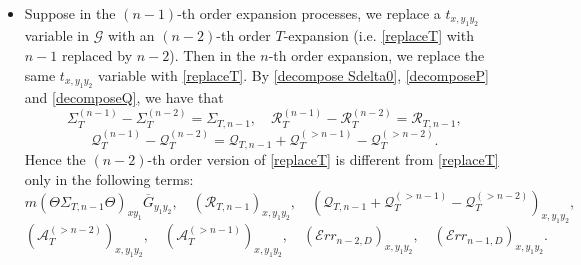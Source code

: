 \documentclass{article}
\newcommand{\1}{\mathds{1}}
\numberwithin{equation}{section}
\renewcommand{\cal}{\mathcal}
\theoremstyle{plain} %
\theoremstyle{remark}
\newcommand{\Sdelta}{{\Sigma}_T}
\newcommand{\PT}{\mathcal R_T}
\newcommand{\QT}{\mathcal Q_T}
\newcommand{\AT}{\mathcal A_T}
\newcommand{\Err}{{\mathcal Err}}
\begin{document}
\begin{itemize}
\item Suppose in the $(n-1)$-th order expansion processes, we replace a $t_{x,y_1y_2}$ variable in $\cal G$ with an $(n-2)$-th order $T$-expansion (i.e. \eqref{replaceT} with $n-1$ replaced by $n-2$). Then in the $n$-th order expansion, we replace the {same $t_{x,y_1y_2}$ variable} with \eqref{replaceT}. By \eqref{decompose Sdelta0}, \eqref{decomposeP} and \eqref{decomposeQ}, we have that
$$\Sdelta^{(n-1)}-\Sdelta^{(n-2)}=\Sigma_{T,n-1},\quad \PT^{(n-1)}-\PT^{(n-2)}=\cal R_{T,n-1},$$ 
$$  \QT^{(n-1)}-\QT^{(n-2)}=\cal Q_{T,n-1}+\QT^{(>n-1)}- \QT^{(>n-2)}. $$
Hence the $(n-2)$-th order version of \eqref{replaceT} is different from \eqref{replaceT} only in the following terms: $$m(\Theta\Sigma_{T,n-1}\Theta)_{xy_1}\overline G_{y_1y_2}, \quad  (\cal R_{T,n-1})_{x,y_1y_2}, \quad  (\cal Q_{T,n-1}+\QT^{(>n-1)}- \QT^{(>n-2)})_{x,y_1y_2},$$ 
$$(\AT^{(>n-2)})_{x,y_1y_2}, \quad (\AT^{(>n-1)})_{x,y_1y_2}, \quad (\Err_{n-2,D})_{x,y_1y_2}, \quad (\Err_{n-1,D})_{x,y_1y_2}.$$  

\end{itemize}
\end{document}
